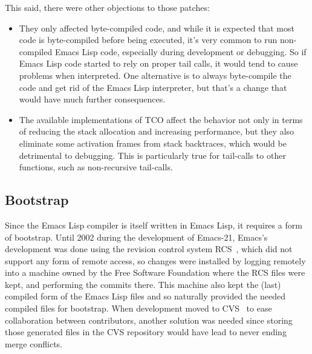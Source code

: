 \documentclass[format=acmsmall, review]{acmart}
\newcommand \Elisp {Emacs Lisp}
\begin{document}
This said, there were other objections to those patches:
\begin{itemize}
\item They only affected byte-compiled code, and while it is expected that
  most code is byte-compiled before being executed, it's very common to run
  non-compiled \Elisp{} code, especially during development or debugging.
  So if \Elisp{} code started to rely on proper tail calls, it would tend to cause problems
  when interpreted.  One alternative is to always byte-compile the code and
  get rid of the \Elisp{} interpreter, but that's a change that would have
  much further consequences.
\item The available implementations of TCO affect the behavior not only in
  terms of reducing the stack
  allocation and increasing performance, but they also eliminate some
  activation frames from stack backtraces, which would be detrimental to
  debugging.  This is particularly true for tail-calls to
  other functions, such as non-recursive tail-calls.
\end{itemize}

\subsection{Bootstrap}
\label{sec:bootstrap}

Since the \Elisp{} compiler is itself written in \Elisp{}, it requires
a form of bootstrap.  Until 2002 during the development of Emacs-21, Emacs's
development was done using the revision control system RCS~\cite{Tichy85},
which did not support any form of remote access, so
changes were installed by logging remotely into a machine owned by the
Free Software Foundation where the RCS files were kept, and
performing the commits there.  This machine also kept the (last) compiled
form of the \Elisp{} files and so naturally provided the needed compiled
files for bootstrap.  When development moved to CVS~\cite{Berliner90} to ease
collaboration between contributors, another solution was needed since
storing those generated files in the CVS repository
would have lead to never ending merge conflicts.
\end{document}

